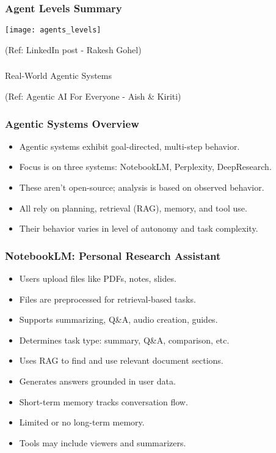 \begin{frame}[fragile]\frametitle{Agent Levels Summary}
\begin{center}
\texttt{[image: agents\_levels]}
\end{center}

{\tiny (Ref: LinkedIn post - Rakesh Gohel)}
\end{frame}


\begin{frame}[fragile]\frametitle{}
\begin{center}
{\Large Real-World Agentic Systems}

{\tiny (Ref: Agentic AI For Everyone - Aish \& Kiriti)}
\end{center}
\end{frame}

\begin{frame}[fragile]\frametitle{Agentic Systems Overview}
    \begin{itemize}
        \item Agentic systems exhibit goal-directed, multi-step behavior.
        \item Focus is on three systems: NotebookLM, Perplexity, DeepResearch.
        \item These aren't open-source; analysis is based on observed behavior.
        \item All rely on planning, retrieval (RAG), memory, and tool use.
        \item Their behavior varies in level of autonomy and task complexity.
    \end{itemize}
\end{frame}

\begin{frame}[fragile]\frametitle{NotebookLM: Personal Research Assistant}
    \begin{itemize}
        \item Users upload files like PDFs, notes, slides.
        \item Files are preprocessed for retrieval-based tasks.
        \item Supports summarizing, Q\&A, audio creation, guides.
        \item Determines task type: summary, Q\&A, comparison, etc.
        \item Uses RAG to find and use relevant document sections.
        \item Generates answers grounded in user data.
        \item Short-term memory tracks conversation flow.
        \item Limited or no long-term memory.
        \item Tools may include viewers and summarizers.
    \end{itemize}
\end{frame}

